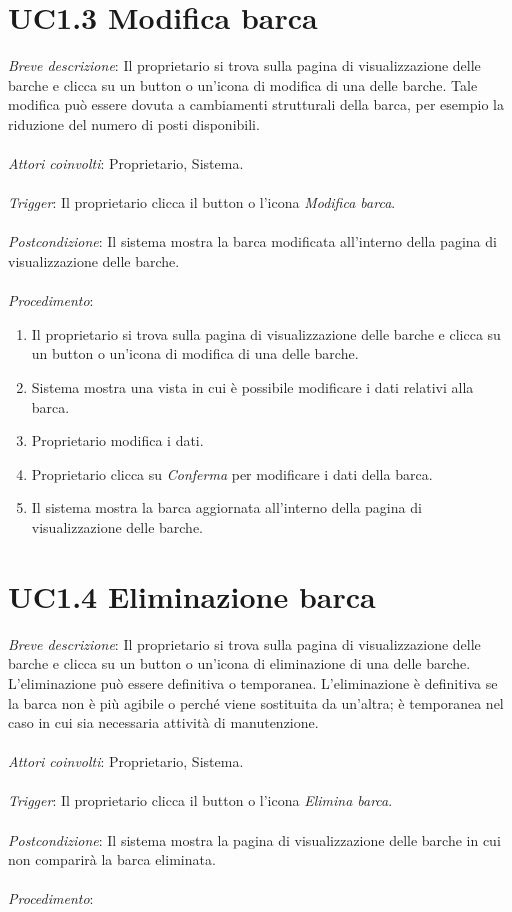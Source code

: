 \section{UC1.3 Modifica barca}

\emph{Breve descrizione}: Il proprietario si trova sulla pagina di visualizzazione delle barche e clicca su un button o un'icona di modifica di una delle barche.
Tale modifica può essere dovuta a cambiamenti strutturali della barca, per esempio la riduzione del numero di posti disponibili.
\\\\
\emph{Attori coinvolti}: Proprietario, Sistema.\\\\
\emph{Trigger}: Il proprietario clicca il button o l'icona \textit{Modifica barca}.\\\\
\emph{Postcondizione}: Il sistema mostra la barca modificata all'interno della pagina di visualizzazione delle barche.\\\\
\emph{Procedimento}:

\begin{enumerate}
    \item Il proprietario si trova sulla pagina di visualizzazione delle barche e clicca su un button o un'icona di modifica di una delle barche.
    \item Sistema mostra una vista in cui è possibile modificare i dati relativi alla barca.
    \item Proprietario modifica i dati.
    \item Proprietario clicca su \textit{Conferma} per modificare i dati della barca.
    \item Il sistema mostra la barca aggiornata all'interno della pagina di visualizzazione delle barche.
\end{enumerate}

\section{UC1.4 Eliminazione barca}

\emph{Breve descrizione}: Il proprietario si trova sulla pagina di visualizzazione delle barche e clicca su un button o un'icona di eliminazione di una delle barche.
L'eliminazione può essere definitiva o temporanea. L'eliminazione è definitiva se la barca non è più agibile o perché viene sostituita da un'altra;
è temporanea nel caso in cui sia necessaria attività di manutenzione.\\\\
\emph{Attori coinvolti}: Proprietario, Sistema.\\\\
\emph{Trigger}: Il proprietario clicca il button o l'icona \textit{Elimina barca}.\\\\
\emph{Postcondizione}: Il sistema mostra la pagina di visualizzazione delle barche in cui non comparirà la barca eliminata.\\\\
\emph{Procedimento}:

